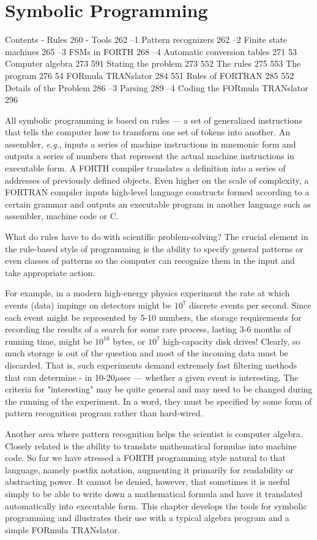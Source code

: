 \chapter{Symbolic Programming}

Contents
- Rules 260
- Tools 262
--1 Pattern recognizers 262
--2 Finite state machines 265
--3 FSMs in FORTH 268
--4 Automatic conversion tables 271
53 Computer algebra 273
591 Stating the problem 273
552 The rules 275
553 The program 276
54 FORmula TRANslator 284
551 Rules of FORTRAN 285
552 Details of the Problem 286
--3 Parsing 289
--4 Coding the FORmula TRANslator 296

All symbolic programming is based on rules --- a set of generalized instructions that tells the computer how to transform one set of tokens into another. An assembler, \textit{e.g.}, inputs a series of machine instructions in mnemonic form and outputs a series of numbers that represent the actual machine instructions in executable form. A FORTH compiler translates a definition into a series of addresses of previously defined objects. Even higher on the scale of complexity, a FORTRAN compiler inputs high-level language constructs formed according to a certain grammar and outputs an executable program in another language such as assembler, machine code or C.

What do rules have to do with scientific problem-solving? The crucial element in the rule-based style of programming is the ability to specify general patterns or even classes of patterns so the computer can recognize them in the input and take appropriate action.

For example, in a modern high-energy physics experiment the rate at which events (data) impinge on detectors might be $10^{7}$ discrete events per second. Since each event might be represented by 5-10 numbers, the storage requirements for recording the results of a search for some rare process, lasting 3-6 months of running time, might be $10^16$ bytes, or $10^7$ high-capacity disk drives! Clearly, so much storage is out of the question and most of the incoming data must be discarded. That is, such experiments demand extremely fast filtering methods that can determine - in 10-20$\mu$sec — whether a given event is interesting. The criteria for "interesting" may be quite general and may need to be changed during the running of the experiment. In a word, they must be specified by some form of pattern recognition program rather than hard-wired.

Another area where pattern recognition helps the scientist is computer algebra. Closely related is the ability to translate mathematical formulae into machine code. So far we have stressed a FORTH programming style natural to that language, namely postfix notation, augmenting it primarily for readability or abstracting power. It cannot be denied, however, that sometimes it is useful simply to be able to write down a mathematical formula and have it translated automatically into executable form. This chapter develops the tools for symbolic programming and illustrates their use with a typical algebra program and a simple FORmula TRANslator.

